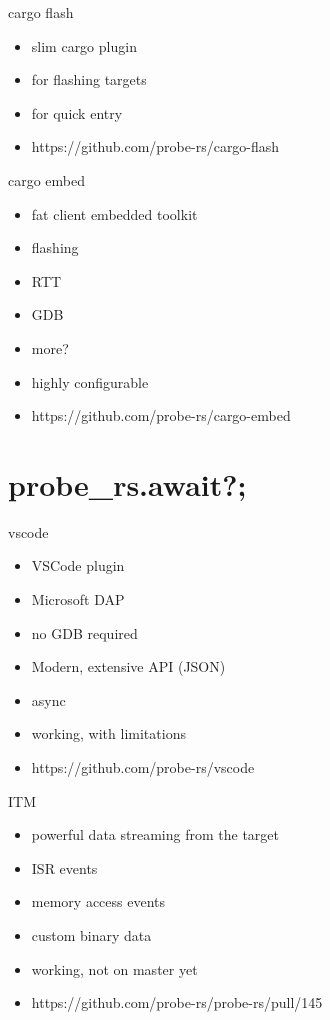 \documentclass[aspectratio=1610,14pt,t]{beamer}
\begin{document}
\begin{frame}[c,fragile]{cargo flash}
  \begin{itemize}
    \item slim cargo plugin
    \item for flashing targets
    \item for quick entry
    \item https://github.com/probe-rs/cargo-flash
  \end{itemize}
\end{frame}

\begin{frame}[c,fragile]{cargo embed}
  \begin{itemize}
    \item fat client embedded toolkit
    \item flashing
    \item RTT
    \item GDB
    \item more?
    \item highly configurable
    \item https://github.com/probe-rs/cargo-embed
  \end{itemize}
\end{frame}

\section{probe\_rs.await?;}

\begin{frame}[c,fragile]{vscode}
  \begin{itemize}
    \item VSCode plugin
    \item Microsoft DAP
    \item no GDB required
    \item Modern, extensive API (JSON)
    \item async
    \item working, with limitations
    \item https://github.com/probe-rs/vscode
  \end{itemize}
\end{frame}

\begin{frame}[c,fragile]{ITM}
  \begin{itemize}
    \item powerful data streaming from the target
    \item ISR events
    \item memory access events
    \item custom binary data
    \item working, not on master yet
    \item https://github.com/probe-rs/probe-rs/pull/145
  \end{itemize}
\end{frame}
\end{document}
